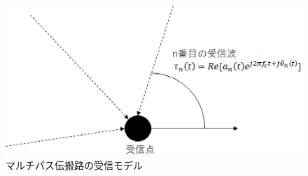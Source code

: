 \begin{figure}[t]
	\begin{center}
		\includegraphics[width=0.7\linewidth]{chapter2/figure/jushin.eps}
		\caption{マルチパス伝搬路の受信モデル}
		\label{fig:coming_waves}
	\end{center}
\end{figure}

